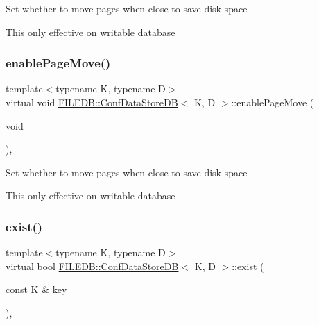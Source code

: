 Set whether to move pages when close to save disk space

This only effective on writable database \mbox{\label{classFILEDB_1_1ConfDataStoreDB_ae8f437f44366624ac0d5aba306a5ba42}} 
\subsubsection{\texorpdfstring{enablePageMove()}{enablePageMove()}\hspace{0.1cm}{\footnotesize\ttfamily [3/3]}}
{\footnotesize\ttfamily template$<$typename K, typename D$>$ \\
virtual void \mbox{\hyperlink{classFILEDB_1_1ConfDataStoreDB}{F\+I\+L\+E\+D\+B\+::\+Conf\+Data\+Store\+DB}}$<$ K, D $>$\+::enable\+Page\+Move (\begin{DoxyParamCaption}\item[{void}]{ }\end{DoxyParamCaption})\hspace{0.3cm}{\ttfamily [inline]}, {\ttfamily [virtual]}}

Set whether to move pages when close to save disk space

This only effective on writable database \mbox{\label{classFILEDB_1_1ConfDataStoreDB_afedf2b2ec0b10469cebb72397b02459d}} 
\subsubsection{\texorpdfstring{exist()}{exist()}\hspace{0.1cm}{\footnotesize\ttfamily [1/3]}}
{\footnotesize\ttfamily template$<$typename K, typename D$>$ \\
virtual bool \mbox{\hyperlink{classFILEDB_1_1ConfDataStoreDB}{F\+I\+L\+E\+D\+B\+::\+Conf\+Data\+Store\+DB}}$<$ K, D $>$\+::exist (\begin{DoxyParamCaption}\item[{const K \&}]{key }\end{DoxyParamCaption})\hspace{0.3cm}{\ttfamily [inline]}, {\ttfamily [virtual]}}

